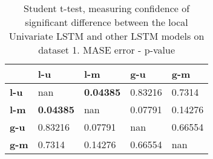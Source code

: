 \begin{table}[H]
\centering
\caption{Student t-test, measuring confidence of significant difference between the local Univariate LSTM and other LSTM models on dataset 1. MASE error - p-value}
\label{table:ttest-p-values-lstm-experiments-MASE-dataset-1}
\begin{tabular}{lllll}
\toprule
{} &               l-u &               l-m &      g-u &      g-m \\
\midrule
\textbf{l-u} &               nan &  \textbf{0.04385} &  0.83216 &   0.7314 \\
\textbf{l-m} &  \textbf{0.04385} &               nan &  0.07791 &  0.14276 \\
\textbf{g-u} &           0.83216 &           0.07791 &      nan &  0.66554 \\
\textbf{g-m} &            0.7314 &           0.14276 &  0.66554 &      nan \\
\bottomrule
\end{tabular}
\end{table}
